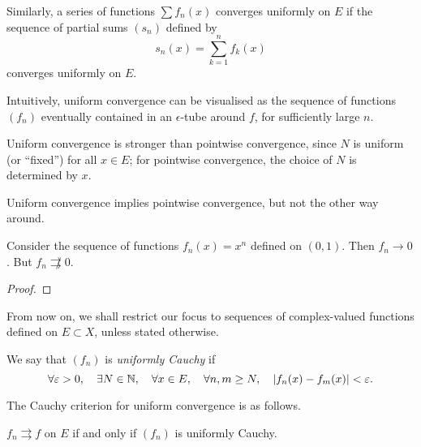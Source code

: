 Similarly, a series of functions $\sum f_n(x)$ converges uniformly on $E$ if the sequence of partial sums $(s_n)$ defined by
\[s_n(x)=\sum_{k=1}^{n}f_k(x)\]
converges uniformly on $E$.

Intuitively, uniform convergence can be visualised as the sequence of functions $(f_n)$ eventually contained in an $\epsilon$-tube around $f$, for sufficiently large $n$. 


\begin{remark}
Uniform convergence is stronger than pointwise convergence, since $N$ is uniform (or ``fixed'') for all $x\in E$; for pointwise convergence, the choice of $N$ is determined by $x$.
\end{remark}

Uniform convergence implies pointwise convergence, but not the other way around.

\begin{example}
Consider the sequence of functions $f_n(x)=x^n$ defined on $(0,1)$. Then $f_n\to0$. But $f_n\not\rightrightarrows 0$.
\begin{proof}

\end{proof}
\end{example}

From now on, we shall restrict our focus to sequences of complex-valued functions defined on $E\subset X$, unless stated otherwise.

We say that $(f_n)$ is \emph{uniformly Cauchy} if
\[\forall\varepsilon>0,\quad\exists N\in\mathbb N,\quad\forall x\in E,\quad\forall n,m\ge N,\quad\left|f_n(x)-f_m(x)\right|<\varepsilon.\]

The Cauchy criterion for uniform convergence is as follows.

\begin{lemma}\label{lemma:uniform-convergence-cauchy}
$f_n\rightrightarrows f$ on $E$ if and only if $(f_n)$ is uniformly Cauchy.
\end{lemma}

